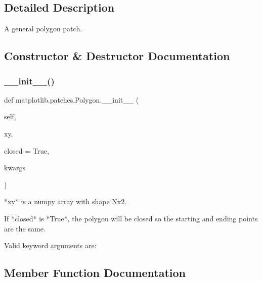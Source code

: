 \subsection{Detailed Description}
\begin{DoxyVerb}A general polygon patch.\end{DoxyVerb}
 

\subsection{Constructor \& Destructor Documentation}
\mbox{\label{classmatplotlib_1_1patches_1_1Polygon_a416ad7c42def4174e7a7ecca4430ed07}} 
\subsubsection{\texorpdfstring{\+\_\+\+\_\+init\+\_\+\+\_\+()}{\_\_init\_\_()}}
{\footnotesize\ttfamily def matplotlib.\+patches.\+Polygon.\+\_\+\+\_\+init\+\_\+\+\_\+ (\begin{DoxyParamCaption}\item[{}]{self,  }\item[{}]{xy,  }\item[{}]{closed = {\ttfamily True},  }\item[{}]{kwargs }\end{DoxyParamCaption})}

\begin{DoxyVerb}*xy* is a numpy array with shape Nx2.

If *closed* is *True*, the polygon will be closed so the
starting and ending points are the same.

Valid keyword arguments are:

\end{DoxyVerb}
 

\subsection{Member Function Documentation}
\mbox{\label{classmatplotlib_1_1patches_1_1Polygon_a2a696d9b36eea8c40e50f1f547aebbc2}} 
